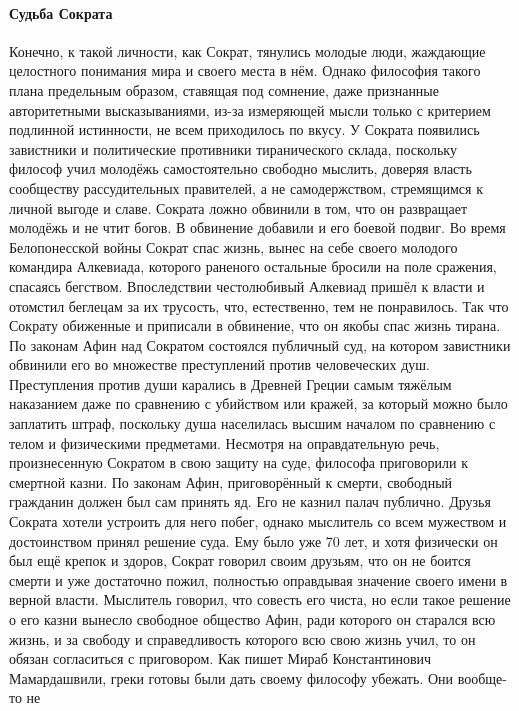 \paragraph{Судьба Сократа}

Конечно, к такой личности, как Сократ, тянулись
молодые люди, жаждающие целостного понимания мира и своего места в нём. Однако
философия такого плана предельным образом, ставящая под сомнение, даже
признанные авторитетными высказываниями, из-за измеряющей мысли только с
критерием подлинной истинности, не всем приходилось по вкусу. У Сократа
появились завистники и политические противники тиранического склада, поскольку
философ учил молодёжь самостоятельно свободно мыслить, доверяя власть сообществу
рассудительных правителей, а не самодержством, стремящимся к личной выгоде и
славе. Сократа ложно обвинили в том, что он развращает молодёжь и не чтит богов.
В обвинение добавили и его боевой подвиг. Во время Белопонесской войны Сократ
спас жизнь, вынес на себе своего молодого командира Алкевиада, которого раненого
остальные бросили на поле сражения, спасаясь бегством. Впоследствии честолюбивый
Алкевиад пришёл к власти и отомстил беглецам за их трусость, что, естественно,
тем не понравилось. Так что Сократу обиженные и приписали в обвинение, что он
якобы спас жизнь тирана. По законам Афин над Сократом состоялся публичный суд,
на котором завистники обвинили его во множестве преступлений против человеческих
душ. Преступления против души карались в Древней Греции самым тяжёлым наказанием
даже по сравнению с убийством или кражей, за который можно было заплатить штраф,
поскольку душа населилась высшим началом по сравнению с телом и физическими
предметами. Несмотря на оправдательную речь, произнесенную Сократом в свою
защиту на суде, философа приговорили к смертной казни. По законам Афин,
приговорённый к смерти, свободный гражданин должен был сам принять яд. Его не
казнил палач публично. Друзья Сократа хотели устроить для него побег, однако
мыслитель со всем мужеством и достоинством принял решение суда. Ему было уже 70
лет, и хотя физически он был ещё крепок и здоров, Сократ говорил своим друзьям,
что он не боится смерти и уже достаточно пожил, полностью оправдывая значение
своего имени в верной власти. Мыслитель говорил, что совесть его чиста, но если
такое решение о его казни вынесло свободное общество Афин, ради которого он
старался всю жизнь, и за свободу и справедливость которого всю свою жизнь учил,
то он обязан согласиться с приговором. Как пишет Мираб Константинович
Мамардашвили, греки готовы были дать своему философу убежать. Они вообще-то не
